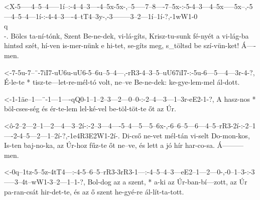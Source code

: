 
  {<X-5-----4--5--4-----1í--:-4--4--3----4--5x-5x-,--5-----7--8----7--5x-:-5-4--3---4--5x-----5x--,-5---4--5--4---1í-:-4-4--3----4--tT4--3y-,-3--------3--2---1í--1í-?,-1wW1-0\\q\\-.}
  {   Bölcs ta-ní-tónk, Szent Be-ne-dek, vi-lá-gíts, Krisz-tu-sunk fé-nyét a vi-lág-ba hintsd szét, hí-ven is-mer-nünk e hi-tet, se-gíts meg, s_töltsd be szí-vün-ket!  Á----men.}

  {<-7-5u-7--¨-7iI7-uU6u-uU6-5--6u--5--4---,-rR3-4--3--5--uU67iI7-:-5u-6---5---4---3r-4-?,}
  {  É-le-te * tisz-te---let-re-mél-tó volt, ne--ve Be-ne-dek:      ke-gye-lem-mel ál-dott.}


  {<-1-1äe--1---¨-1---1----qQ0-1--1--2--3---2---0--0-:-2--4---3---1--3r-eE2-1-?,}
  {  A hasz-nos * böl-cses-ség és ér-te-lem lel-ké-vel be-töl-töt-te őt az  Úr.}




  {<ô-2--2---2--1---2---4---3--2í-:-2--3---4----5--4---5---5--6x-,-6--6--5---6---4--5--rR3-2í-:-2--1----2-4--5---2---1--2í-?,-1e4R3E2W1-2í-.}
  {   Di-cső ne-vet mél-tán vi-selt Do-mon-kos, Is-ten baj-no-ka,  az Úr-hoz fűz-te őt ne--ve,  és lett a jó hír har-co-sa.   Á---------men.}

  {<-0q--1tz-5--5z-4tT4---:-4-5--6--5--rR3-3rR3-1---:-4--5--4--3---eE2--1---2---0-,-0--1--3-:-3-----3--4t--wW1-3--2---1--1-?,}
  {  Bol-dog az a  szent, * a-ki az Úr-ban-bí---zott, az Úr pa-ran-csát hir-det-te, és az ő   szent he-gyé-re  ál-lít-ta-tott.}


